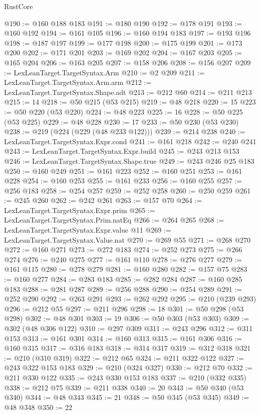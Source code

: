 \begin{lexlean}{RustCore}
\begin{coremodule}
@190 := @160 @188 @183
@191 := @180 @190
@192 := @178 @191
@193 := @160 @192
@194 := @161 @105
@196 := @160 @194 @183
@197 := @193 @196
@198 := @187 @197
@199 := @177 @198
@200 := @175 @199
@201 := @173 @200
@202 := @171 @201
@203 := @169 @202
@204 := @167 @203
@205 := @165 @204
@206 := @163 @205
@207 := @158 @206
@208 := @156 @207
@209 := LexLeanTarget.TargetSyntax.Arm
@210 := @2 @209
@211 := LexLeanTarget.TargetSyntax.Arm.arm
@212 := LexLeanTarget.TargetSyntax.Shape.adt
@213 := @212 @60
@214 := @211 @213
@215 := 14
@218 := @50 @215 (@53 @215)
@219 := @48 @218
@220 := 15
@223 := @50 @220 (@53 @220)
@224 := @48 @223
@225 := 16
@228 := @50 @225 (@53 @225)
@229 := @48 @228
@230 := 17
@233 := @50 @230 (@53 @230)
@238 := @219 (@224 (@229 (@48 @233 @122)))
@239 := @214 @238
@240 := LexLeanTarget.TargetSyntax.Expr.cond
@241 := @161 @218
@242 := @240 @241
@243 := LexLeanTarget.TargetSyntax.Expr.build
@245 := @243 @213 @153
@246 := LexLeanTarget.TargetSyntax.Shape.true
@249 := @243 @246 @25 @183
@250 := @160 @249
@251 := @161 @223
@252 := @160 @251
@253 := @161 @228
@254 := @160 @253
@255 := @161 @233
@256 := @160 @255
@257 := @256 @183
@258 := @254 @257
@259 := @252 @258
@260 := @250 @259
@261 := @245 @260
@262 := @242 @261
@263 := @157 @70
@264 := LexLeanTarget.TargetSyntax.Expr.prim
@265 := LexLeanTarget.TargetSyntax.Prim.natEq
@266 := @264 @265
@268 := LexLeanTarget.TargetSyntax.Expr.value @11
@269 := LexLeanTarget.TargetSyntax.Value.nat
@270 := @269 @55
@271 := @268 @270
@272 := @160 @271
@273 := @272 @183
@274 := @252 @273
@275 := @266 @274
@276 := @240 @275
@277 := @161 @110
@278 := @276 @277
@279 := @161 @115
@280 := @278 @279
@281 := @160 @280
@282 := @157 @75
@283 := @160 @277
@284 := @283 @183
@285 := @282 @284
@287 := @160 @285 @183
@288 := @281 @287
@289 := @256 @288
@290 := @254 @289
@291 := @252 @290
@292 := @263 @291
@293 := @262 @292
@295 := @210 (@239 @293)
@296 := @212 @55
@297 := @211 @296
@298 := 18
@301 := @50 @298 (@53 @298)
@302 := @48 @301
@303 := 19
@306 := @50 @303 (@53 @303)
@309 := @302 (@48 @306 @122)
@310 := @297 @309
@311 := @243 @296
@312 := @311 @153
@313 := @161 @301
@314 := @160 @313
@315 := @161 @306
@316 := @160 @315
@317 := @316 @183
@318 := @314 @317
@319 := @312 @318
@321 := @210 (@310 @319)
@322 := @212 @65
@324 := @211 @322 @122
@327 := @243 @322 @153 @183
@329 := @210 (@324 @327)
@330 := @212 @70
@332 := @211 @330 @122
@335 := @243 @330 @153 @183
@337 := @210 (@332 @335)
@338 := @212 @75
@339 := @211 @338
@340 := 20
@343 := @50 @340 (@53 @340)
@344 := @48 @343
@345 := 21
@348 := @50 @345 (@53 @345)
@349 := @48 @348
@350 := 22

\end{coremodule}
\end{lexlean}
